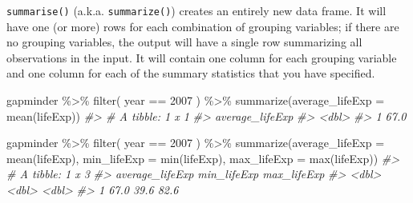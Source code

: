 \documentclass[
]{book}
\newenvironment{Shaded}{\begin{snugshade}}{\end{snugshade}}
\newcommand{\AttributeTok}[1]{\textcolor[rgb]{0.77,0.63,0.00}{#1}}
\newcommand{\CommentTok}[1]{\textcolor[rgb]{0.56,0.35,0.01}{\textit{#1}}}
\newcommand{\DecValTok}[1]{\textcolor[rgb]{0.00,0.00,0.81}{#1}}
\newcommand{\FunctionTok}[1]{\textcolor[rgb]{0.00,0.00,0.00}{#1}}
\newcommand{\NormalTok}[1]{#1}
\newcommand{\SpecialCharTok}[1]{\textcolor[rgb]{0.00,0.00,0.00}{#1}}
\begin{document}
\texttt{summarise()} (a.k.a. \texttt{summarize()}) creates an entirely new data frame. It will have one (or more) rows for each combination of grouping variables; if there are no grouping variables, the output will have a single row summarizing all observations in the input. It will contain one column for each grouping variable and one column for each of the summary statistics that you have specified.

\begin{Shaded}
\begin{Highlighting}[]
\NormalTok{gapminder }\SpecialCharTok{\%\textgreater{}\%} 
  \FunctionTok{filter}\NormalTok{( year }\SpecialCharTok{==} \DecValTok{2007}\NormalTok{ ) }\SpecialCharTok{\%\textgreater{}\%}
  \FunctionTok{summarize}\NormalTok{(}\AttributeTok{average\_lifeExp =} \FunctionTok{mean}\NormalTok{(lifeExp))}
\CommentTok{\#\textgreater{} \# A tibble: 1 x 1}
\CommentTok{\#\textgreater{}   average\_lifeExp}
\CommentTok{\#\textgreater{}             \textless{}dbl\textgreater{}}
\CommentTok{\#\textgreater{} 1            67.0}
\end{Highlighting}
\end{Shaded}

\begin{Shaded}
\begin{Highlighting}[]
\NormalTok{gapminder }\SpecialCharTok{\%\textgreater{}\%} 
  \FunctionTok{filter}\NormalTok{( year }\SpecialCharTok{==} \DecValTok{2007}\NormalTok{ ) }\SpecialCharTok{\%\textgreater{}\%}
  \FunctionTok{summarize}\NormalTok{(}\AttributeTok{average\_lifeExp =} \FunctionTok{mean}\NormalTok{(lifeExp),}
            \AttributeTok{min\_lifeExp =} \FunctionTok{min}\NormalTok{(lifeExp),}
            \AttributeTok{max\_lifeExp =} \FunctionTok{max}\NormalTok{(lifeExp))}
\CommentTok{\#\textgreater{} \# A tibble: 1 x 3}
\CommentTok{\#\textgreater{}   average\_lifeExp min\_lifeExp max\_lifeExp}
\CommentTok{\#\textgreater{}             \textless{}dbl\textgreater{}       \textless{}dbl\textgreater{}       \textless{}dbl\textgreater{}}
\CommentTok{\#\textgreater{} 1            67.0        39.6        82.6}
\end{Highlighting}
\end{Shaded}
\end{document}
